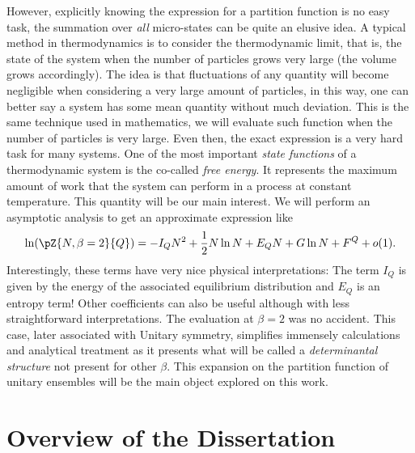 However, explicitly knowing the expression for a partition function is no easy task, the summation over \textit{all} micro-states can be quite an elusive idea. A typical method in thermodynamics is to consider the thermodynamic limit, that is, the state of the system when the number of particles grows very large (the volume grows accordingly). The idea is that fluctuations of any quantity will become negligible when considering a very large amount of particles, in this way, one can better say a system has some mean quantity without much deviation. This is the same technique used in mathematics, we will evaluate such function when the number of particles is very large. Even then, the exact expression is a very hard task for many systems. One of the most important \textit{state functions} of a thermodynamic system is the co-called \textit{free energy}. It represents the maximum amount of work that the system can perform in a process at constant temperature. This quantity will be our main interest. We will perform an asymptotic analysis to get an approximate expression like
\begin{equation}
	\ln(\pZ{N, \beta=2}{Q}) = -I_Q N^2+\frac{1}{2} N\ln N+E_Q N+G\ln N+F^Q + o(1).
\end{equation}
Interestingly, these terms have very nice physical interpretations: The term $I_Q$ is given by the energy of the associated equilibrium distribution and $E_Q$ is an entropy term! Other coefficients can also be useful although with less straightforward interpretations. The evaluation at $\beta=2$ was no accident. This case, later associated with Unitary symmetry, simplifies immensely calculations and analytical treatment as it presents what will be called a \textit{determinantal structure} not present for other $\beta$. This expansion on the partition function of unitary ensembles will be the main object explored on this work.

\section{Overview of the Dissertation}
\label{section: overview}

